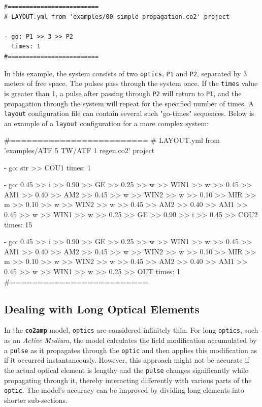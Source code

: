 \documentclass{report}
\begin{document}
\begin{verbatim}
#=========================
# LAYOUT.yml from 'examples/00 simple propagation.co2' project

- go: P1 >> 3 >> P2
  times: 1
#=========================
\end{verbatim}

In this example, the system consists of two \texttt{optics}, \texttt{P1} and \texttt{P2}, separated by 3 meters of free space. The pulses pass through the system once. If the \texttt{times} value is greater than 1, a pulse after passing through \texttt{P2} will return to \texttt{P1}, and the propagation through the system will repeat for the specified number of times. A \texttt{layout} configuration file can contain several such "go-times" sequences. Below is an example of a \texttt{layout} configuration for a more complex system:

\begin{spverbatim}
#=========================
# LAYOUT.yml from 'examples/ATF 5 TW/ATF 1 regen.co2' project

- go: str >> COU1
  times: 1

- go: 0.45 >> i >> 0.90 >> GE >> 0.25 >> w >> WIN1 >> w >> 0.45 >> AM1 >> 0.40 >> AM2 >> 0.45 >> w >> WIN2 >> w >> 0.10 >> MIR >> m >> 0.10 >> w >> WIN2 >> w >> 0.45 >> AM2 >> 0.40 >> AM1 >> 0.45 >> w >> WIN1 >> w >> 0.25 >> GE >> 0.90 >> i >> 0.45 >> COU2
  times: 15

- go: 0.45 >> i >> 0.90 >> GE >> 0.25 >> w >> WIN1 >> w >> 0.45 >> AM1 >> 0.40 >> AM2 >> 0.45 >> w >> WIN2 >> w >> 0.10 >> MIR >> m >> 0.10 >> w >> WIN2 >> w >> 0.45 >> AM2 >> 0.40 >> AM1 >> 0.45 >> w >> WIN1 >> w >> 0.25 >> OUT
  times: 1
#=========================
\end{spverbatim}


\subsection{Dealing with Long Optical Elements}
In the \textbf{\texttt{co2amp}} model, \texttt{optics} are considered infinitely thin. For long \texttt{optics}, such as an \textit{Active Medium}, the model calculates the field modification accumulated by a \texttt{pulse} as it propagates through the \texttt{optic} and then applies this modification as if it occurred instantaneously. However, this approach might not be accurate if the actual optical element is lengthy and the \texttt{pulse} changes significantly while propagating through it, thereby interacting differently with various parts of the \texttt{optic}. The model's accuracy can be improved by dividing long elements into shorter sub-sections.
\end{document}
